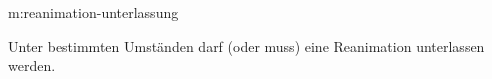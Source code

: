 {m:reanimation-unterlassung}
{%
Unter bestimmten Umständen darf
(oder muss) eine Reanimation unterlassen
werden.

}{}

